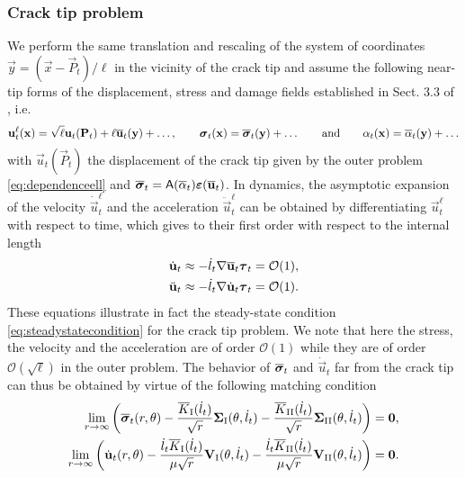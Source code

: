 \subsubsection{Crack tip problem}
We perform the same translation and rescaling of the system of coordinates $\vec{y}=(\vec{x}-\vec{P}_t)/\ell$ in the vicinity of the crack tip and assume the following near-tip forms of the displacement, stress and damage fields established in Sect. 3.3 of \cite{SicsicMarigo:2013}, i.e.
\[
\vec{u}_t^\ell(\vec{x})=\sqrt{\ell}\vec{u}_t(\vec{P}_t)+\ell\overline{\vec{u}}_t(\vec{y})+\ldots,\qquad\sig_t(\vec{x})=\overline{\sig}_t(\vec{y})+\ldots\qquad\text{and}\qquad\alpha_t(\vec{x})=\overline{\alpha}_t(\vec{y})+\ldots
\]
with $\vec{u}_t(\vec{P}_t)$ the displacement of the crack tip given by the outer problem \eqref{eq:dependenceell} and $\overline{\sig}_t=\tens{A}(\overline{\alpha}_t)\eps(\overline{\vec{u}}_t)$. In dynamics, the asymptotic expansion of the velocity $\dot{\vec{u}}_t^\ell$ and the acceleration $\ddot{\vec{u}}_t^\ell$ can be obtained by differentiating $\vec{u}_t^\ell$ with respect to time, which gives to their first order with respect to the internal length
\begin{equation} \label{eq:asymsteadycondition}
\begin{aligned}
\dot{\vec{u}}_t &\approx -\dot{l}_t\nabla\overline{\vec{u}}_t\vtau_t=\mathcal{O}(1), \\
\ddot{\vec{u}}_t &\approx -\dot{l}_t\nabla\dot{\vec{u}}_t\vtau_t=\mathcal{O}(1).
\end{aligned}
\end{equation}
These equations illustrate in fact the steady-state condition \eqref{eq:steadystatecondition} for the crack tip problem. We note that here the stress, the velocity and the acceleration are of order $\mathcal{O}(1)$ while they are of order $\mathcal{O}(\sqrt{\ell})$ in the outer problem. The behavior of $\overline{\sig}_t$ and $\dot{\vec{u}}_t$ far from the crack tip can thus be obtained by virtue of the following matching condition
\begin{equation} \label{eq:asymgradu}
\begin{aligned}
\lim_{r\to\infty}\left(\overline{\sig}_t(r,\theta)-\frac{\overline{K}_\RN{1}(\dot{l}_t)}{\sqrt{r}}\vec{\Sigma}_\RN{1}(\theta,\dot{l}_t)-\frac{\overline{K}_\RN{2}(\dot{l}_t)}{\sqrt{r}}\vec{\Sigma}_\RN{2}(\theta,\dot{l}_t)\right)=\vec{0}, \\
\lim_{r\to\infty}\left(\dot{\vec{u}}_t(r,\theta)-\frac{\dot{l}_t\overline{K}_\RN{1}(\dot{l}_t)}{\mu\sqrt{r}}\vec{V}_\RN{1}(\theta,\dot{l}_t)-\frac{\dot{l}_t\overline{K}_\RN{2}(\dot{l}_t)}{\mu\sqrt{r}}\vec{V}_\RN{2}(\theta,\dot{l}_t)\right)=\vec{0}.
\end{aligned}
\end{equation}
